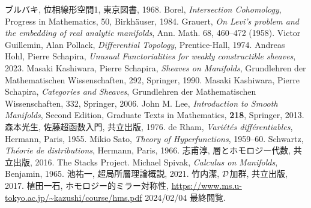 \begin{thebibliography}{20} 
     ブルバキ, 位相線形空間1, 東京図書, 1968.
     Borel, 
    \textit{Intersection Cohomology}, 
    Progress in Mathematics, 50, Birkh\"auser, 1984.
 Grauert, 
    \textit{On Levi's problem and the embedding of real analytic manifolds}, 
    Ann. Math. 68, 460--472 (1958).
 Victor Guillemin, Alan Pollack, 
    \textit{Differential Topology}, 
    Prentice-Hall, 1974.
     Andreas Hohl, Pierre Schapira, 
    \textit{Unusual Functorialities for weakly constructible sheaves}, 
    2023.
     Masaki Kashiwara, Pierre Schapira, 
    \textit{Sheaves on Manifolds}, 
    Grundlehren der Mathematischen Wissenschaften, 292, Springer, 1990.
 Masaki Kashiwara, Pierre Schapira, 
    \textit{Categories and Sheaves}, 
    Grundlehren der Mathematischen Wissenschaften, 332, Springer, 2006.
     John M. Lee, 
    \textit{Introduction to Smooth Manifolds}, Second Edition,
    Graduate Texts in Mathematics, \textbf{218}, Springer, 2013.
     森本光生, 佐藤超函数入門, 共立出版, 1976. 
 de Rham, 
    \textit{Vari\'et\'es diff\'erentiables}, 
    Hermann, Paris, 1955.
 Mikio Sato, 
    \textit{Theory of Hyperfunctions}, 
    1959--60.
 Schwartz, 
    \textit{Th\'eorie de distributions}, 
    Hermann, Paris, 1966.
 志甫淳, 層とホモロジー代数, 共立出版, 2016.
 The Stacks Project.
 Michael Spivak, 
\textit{Calculus on Manifolds}, 
Benjamin, 1965.
 池祐一, 超局所層理論概説, 2021.
 竹内潔, \(\mathcal{D}\)加群, 共立出版, 2017.
 植田一石, ホモロジー的ミラー対称性, \url{https://www.ms.u-tokyo.ac.jp/~kazushi/course/hms.pdf} 2024/02/04 最終閲覧.

\end{thebibliography}




